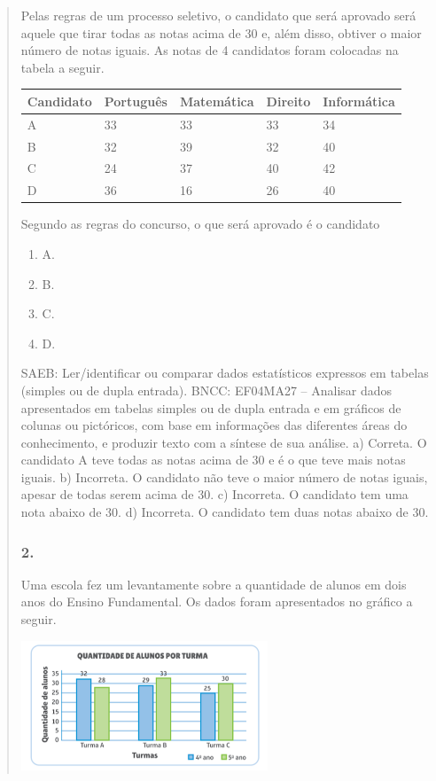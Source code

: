 \begin{enumerate}
\begin{escolha}
\begin{enumerate}
\begin{itemize}
\begin{itemize}
\begin{escolha}
\begin{quote}
\begin{escolha}
{Pelas regras de um processo seletivo, o candidato que será aprovado será
aquele que tirar todas as notas acima de 30 e, além disso, obtiver o maior
número de notas iguais. As notas de 4 candidatos foram colocadas na
tabela a seguir.

\begin{longtable}[]{@{}lllll@{}}
\toprule
Candidato & Português & Matemática & Direito &
Informática\tabularnewline
\midrule
\endhead
A & 33 & 33 & 33 & 34\tabularnewline
B & 32 & 39 & 32 & 40\tabularnewline
C & 24 & 37 & 40 & 42\tabularnewline
D & 36 & 16 & 26 & 40\tabularnewline
\bottomrule
\end{longtable}

Segundo as regras do concurso, o que será aprovado é o candidato

\begin{enumerate}
\def\labelenumi{\alph{enumi})}
\item
  A.
\item
  B.
\item
  C.
\item
  D.
\end{enumerate}

SAEB: Ler/identificar ou comparar dados estatísticos expressos em tabelas (simples ou de dupla entrada).
BNCC: EF04MA27 -- Analisar dados apresentados em tabelas simples ou de dupla entrada e em gráficos de
colunas ou pictóricos, com base em informações das diferentes áreas do conhecimento, e produzir
texto com a síntese de sua análise.
a) Correta. O candidato A teve todas as notas acima de 30 e é o que teve mais notas iguais.
b) Incorreta. O candidato não teve o maior número de notas iguais, apesar de todas serem acima de 30.
c) Incorreta. O candidato tem uma nota abaixo de 30.
d) Incorreta. O candidato tem duas notas abaixo de 30.


\subsubsection{2.}\label{section-102}

Uma escola fez um levantamente sobre a quantidade de alunos em dois anos
do Ensino Fundamental. Os dados foram apresentados no gráfico a seguir.


\includegraphics[width=2.89744in,height=1.52156in]{media/image104.png}

}
\end{escolha}
\end{quote}
\end{escolha}
\end{itemize}
\end{itemize}
\end{enumerate}
\end{escolha}
\end{enumerate}
